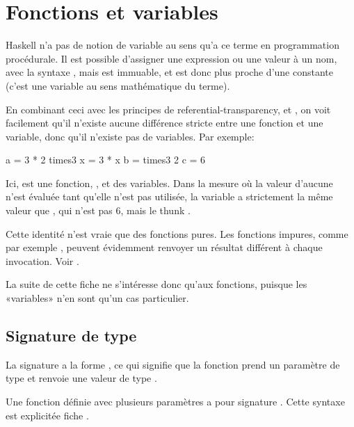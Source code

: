 \section{Fonctions et variables}
\label{functions-and-variables}

Haskell n'a pas de notion de variable au sens qu'a ce terme en programmation procédurale. Il est possible d'assigner une expression ou une valeur à un nom, avec la syntaxe , mais  est immuable, et est donc plus proche d'une constante (c'est une variable au sens mathématique du terme).

En combinant ceci avec les principes de \gls{referential-transparency},  et , on voit facilement qu'il n'existe aucune différence stricte entre une fonction et une variable, donc qu'il n'existe pas de variables. Par exemple:

\begin{haskellcode}
a = 3 * 2
times3 x = 3 * x
b = times3 2
c = 6
\end{haskellcode}

Ici,  est une fonction, ,  et  des variables. Dans la mesure où la valeur d'aucune n'est évaluée tant qu'elle n'est pas utilisée, la variable  a strictement la même valeur que , qui n'est pas 6, mais le \gls{thunk} .

\begin{warnbox}
Cette identité n'est vraie que des fonctions pures. Les fonctions impures, comme par exemple , peuvent évidemment renvoyer un résultat différent à chaque invocation. Voir .
\end{warnbox}

La suite de cette fiche ne s'intéresse donc qu'aux fonctions, puisque les «variables» n'en sont qu'un cas particulier.

\subsection{Signature de type}
\label{type-signatures}

La signature a la forme , ce qui signifie que la fonction prend un paramètre de type  et renvoie une valeur de type .

Une fonction définie avec plusieurs paramètres a pour signature . Cette syntaxe est explicitée fiche .

